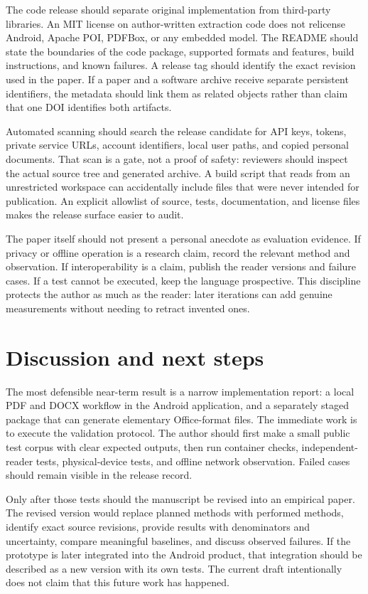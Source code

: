 \documentclass[10pt,letterpaper]{article}
\begin{document}
The code release should separate original implementation from third-party libraries. An MIT license on author-written extraction code does not relicense Android, Apache POI, PDFBox, or any embedded model. The README should state the boundaries of the code package, supported formats and features, build instructions, and known failures. A release tag should identify the exact revision used in the paper. If a paper and a software archive receive separate persistent identifiers, the metadata should link them as related objects rather than claim that one DOI identifies both artifacts.

Automated scanning should search the release candidate for API keys, tokens, private service URLs, account identifiers, local user paths, and copied personal documents. That scan is a gate, not a proof of safety: reviewers should inspect the actual source tree and generated archive. A build script that reads from an unrestricted workspace can accidentally include files that were never intended for publication. An explicit allowlist of source, tests, documentation, and license files makes the release surface easier to audit.

The paper itself should not present a personal anecdote as evaluation evidence. If privacy or offline operation is a research claim, record the relevant method and observation. If interoperability is a claim, publish the reader versions and failure cases. If a test cannot be executed, keep the language prospective. This discipline protects the author as much as the reader: later iterations can add genuine measurements without needing to retract invented ones.

\section{Discussion and next steps}

The most defensible near-term result is a narrow implementation report: a local PDF and DOCX workflow in the Android application, and a separately staged package that can generate elementary Office-format files. The immediate work is to execute the validation protocol. The author should first make a small public test corpus with clear expected outputs, then run container checks, independent-reader tests, physical-device tests, and offline network observation. Failed cases should remain visible in the release record.

Only after those tests should the manuscript be revised into an empirical paper. The revised version would replace planned methods with performed methods, identify exact source revisions, provide results with denominators and uncertainty, compare meaningful baselines, and discuss observed failures. If the prototype is later integrated into the Android product, that integration should be described as a new version with its own tests. The current draft intentionally does not claim that this future work has happened.
\end{document}
